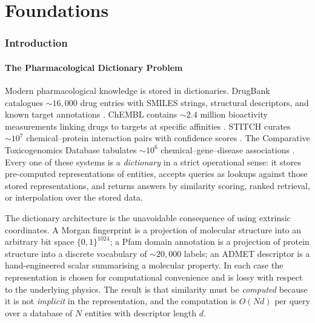 \documentclass[11pt,twocolumn,a4paper]{article}
\theoremstyle{definition}
\theoremstyle{remark}
\begin{document}
\medskip

\part{Foundations}

\section{Introduction}
\label{sec:introduction}

\subsection{The Pharmacological Dictionary Problem}

Modern pharmacological knowledge is stored in dictionaries. DrugBank catalogues $\sim\!16{,}000$ drug entries with SMILES strings, structural descriptors, and known target annotations \citep{wishart2018}. ChEMBL contains $\sim\!2.4$ million bioactivity measurements linking drugs to targets at specific affinities \citep{mendez2019}. STITCH curates $\sim\!10^7$ chemical--protein interaction pairs with confidence scores \citep{szklarczyk2016}. The Comparative Toxicogenomics Database tabulates $\sim\!10^6$ chemical--gene--disease associations \citep{davis2023}. Every one of these systems is a \emph{dictionary} in a strict operational sense: it stores pre-computed representations of entities, accepts queries as lookups against those stored representations, and returns answers by similarity scoring, ranked retrieval, or interpolation over the stored data.

The dictionary architecture is the unavoidable consequence of using extrinsic coordinates. A Morgan fingerprint is a projection of molecular structure into an arbitrary bit space $\{0,1\}^{1024}$; a Pfam domain annotation is a projection of protein structure into a discrete vocabulary of $\sim\!20{,}000$ labels; an ADMET descriptor is a hand-engineered scalar summarising a molecular property. In each case the representation is chosen for computational convenience and is lossy with respect to the underlying physics. The result is that similarity must be \emph{computed} because it is not \emph{implicit} in the representation, and the computation is $O(Nd)$ per query over a database of $N$ entities with descriptor length $d$.
\end{document}
